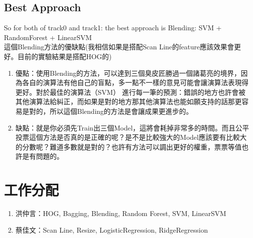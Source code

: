 \documentclass[12pt]{article}
\theoremstyle{definition}
\theoremstyle{remark}
\begin{document}
\subsection{Best Approach}
So for both of track0 and track1: the best approach is {\color{red}Blending: SVM + RandomForest + LinearSVM}\\
這個Blending方法的優缺點(我相信如果是搭配Scan Line的feature應該效果會更好。目前的實驗結果是搭配HOG的)
\begin{enumerate}
    \item 優點：使用Blending的方法，可以達到三個臭皮匠勝過一個諸葛亮的境界，因為各自的演算法有他自己的盲點，多一點不一樣的意見可能會讓演算法表現得更好。對於最佳的演算法（SVM） 進行每一筆的預測：錯誤的地方也許會被其他演算法給糾正，而如果是對的地方那其他演算法也能如願支持的話那更容易是對的，所以這個Blending的方法是會讓成果更進步的。
    \item 缺點：就是你必須先Train出三個Model，這將會耗掉非常多的時間。而且公平投票這個方法是否真的是正確的呢？是不是比較強大的Model應該要有比較大的分數呢？難道多數就是對的？也許有方法可以調出更好的權重，票票等值也許是有問題的。
\end{enumerate}

\section{工作分配}
\begin{enumerate}
    \item 洪仲言：HOG, Bagging, Blending, Random Forest, SVM, LinearSVM\\
    \item 蔡佳文：Scan Line, Resize, LogisticRegression, RidgeRegression
\end{enumerate}
\end{document}
